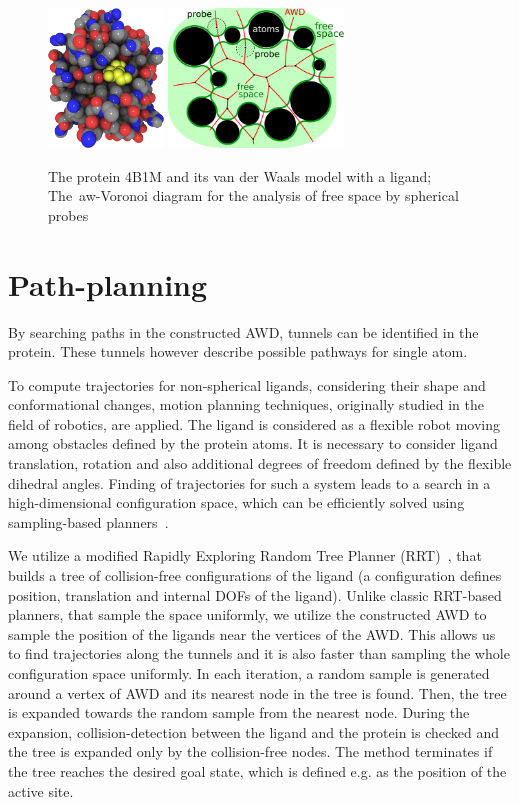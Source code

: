 \documentclass[conference]{IEEEtran}
\begin{document}
\begin{figure}[htb]
\centering
\includegraphics[height=10em]{figures/4b1m}
\hspace{1em}
\includegraphics[height=10em]{figures/awd}
\caption{The protein 4B1M \cite{Cuskin2012} and its van der Waals model with a ligand; The~\mbox{aw-Voronoi} diagram for the analysis of free space by spherical probes}
\label{fig:vd}
\end{figure}

\section{Path-planning}

By searching paths in the constructed AWD, tunnels can be identified in the protein.
These tunnels however describe possible pathways for single atom.

To compute trajectories for non-spherical ligands, considering their shape and conformational changes, 
motion planning techniques, originally studied in the field of robotics, are applied.
The ligand is considered as a flexible robot moving among obstacles defined by the protein atoms.
It is necessary to consider ligand translation, rotation and also additional degrees of freedom defined by the flexible dihedral angles.
Finding of trajectories for such a system leads to a search in a high-dimensional configuration space, which can be efficiently
solved using sampling-based planners~\cite{Lav06}.

We utilize a modified Rapidly Exploring Random Tree Planner (RRT)~\cite{vonasek2017tunnel}, that builds
a tree of collision-free configurations of the ligand (a configuration defines position, translation and internal DOFs of the ligand).
Unlike classic RRT-based planners, that sample the space uniformly, we utilize the constructed AWD to sample the position
of the ligands near the vertices of the AWD.
This allows us to find trajectories along the tunnels and it is also faster than sampling the whole configuration space uniformly.
In each iteration, a random sample is generated around a vertex of AWD and its nearest node in the tree is found.
Then, the tree is expanded towards the random sample from the nearest node. 
During the expansion, collision-detection between the ligand and the protein is checked and the tree is expanded only by the 
collision-free nodes.
The method terminates if the tree reaches the desired goal state, which is  defined e.g. as the position of the active site.
\end{document}
